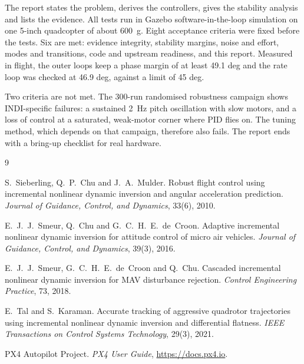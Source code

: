 The report states the problem, derives the controllers, gives the stability analysis and lists the evidence.
All tests run in Gazebo software-in-the-loop simulation on one 5-inch quadcopter of about 600~g.
Eight acceptance criteria were fixed before the tests.
Six are met: evidence integrity, stability margins, noise and effort, modes and transitions, code and upstream readiness, and this report.
Measured in flight, the outer loops keep a phase margin of at least 49.1 deg and the rate loop was checked at 46.9 deg, against a limit of 45 deg.

Two criteria are not met.
The 300-run randomised robustness campaign shows INDI-specific failures: a sustained 2~Hz pitch oscillation with slow motors, and a loss of control at a saturated, weak-motor corner where PID flies on.
The tuning method, which depends on that campaign, therefore also fails.
The report ends with a bring-up checklist for real hardware.

\tableofcontents
\listoffigures
\listoftables

\clearpage
{}











\appendix



\begin{thebibliography}{9}
S.~Sieberling, Q.~P.~Chu and J.~A.~Mulder.
Robust flight control using incremental nonlinear dynamic inversion and angular acceleration prediction.
\emph{Journal of Guidance, Control, and Dynamics}, 33(6), 2010.

E.~J.~J.~Smeur, Q.~Chu and G.~C.~H.~E.~de~Croon.
Adaptive incremental nonlinear dynamic inversion for attitude control of micro air vehicles.
\emph{Journal of Guidance, Control, and Dynamics}, 39(3), 2016.

E.~J.~J.~Smeur, G.~C.~H.~E.~de~Croon and Q.~Chu.
Cascaded incremental nonlinear dynamic inversion for MAV disturbance rejection.
\emph{Control Engineering Practice}, 73, 2018.

E.~Tal and S.~Karaman.
Accurate tracking of aggressive quadrotor trajectories using incremental nonlinear dynamic inversion and differential flatness.
\emph{IEEE Transactions on Control Systems Technology}, 29(3), 2021.

PX4 Autopilot Project.
\emph{PX4 User Guide}, \url{https://docs.px4.io}.
\end{thebibliography}


